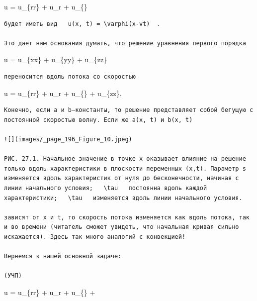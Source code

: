 \documentclass[
  ukrainian,
]{article}
\begin{document}
\Delta u = u\_\{rr\} + u\_r +
u\_\{\theta\theta\}

\begin{verbatim}
будет иметь вид   u(x, t) = \varphi(x-vt)  .

Это дает нам основания думать, что решение уравнения первого порядка
\end{verbatim}

\Delta u = u\_\{xx\} + u\_\{yy\} + u\_\{zz\}

\begin{verbatim}
переносится вдоль потока со скоростью
\end{verbatim}

\Delta u = u\_\{rr\} + u\_r +
u\_\{\theta\theta\} + u\_\{zz\}.

\begin{verbatim}
Конечно, если a и b—константы, то решение представляет собой бегущую с постоянной скоростью волну. Если же a(x, t) и b(x, t)

![](images/_page_196_Figure_10.jpeg)

РИС. 27.1. Начальное значение в точке x оказывает влияние на решение только вдоль характеристики в плоскости переменных (x,t). Параметр s изменяется вдоль характеристик от нуля до бесконечности, начиная с линии начального условия;   \tau   постоянна вдоль каждой характеристики;   \tau   изменяется вдоль линии начального условия.

зависят от x и t, то скорость потока изменяется как вдоль потока, так и во времени (читатель сможет увидеть, что начальная кривая сильно искажается). Здесь так много аналогий с конвекцией!

Вернемся к нашей основной задаче:

(УЧП)
\end{verbatim}

\Delta u = u\_\{rr\} + u\_r +
u\_\{\theta\theta\} + 
\end{document}
